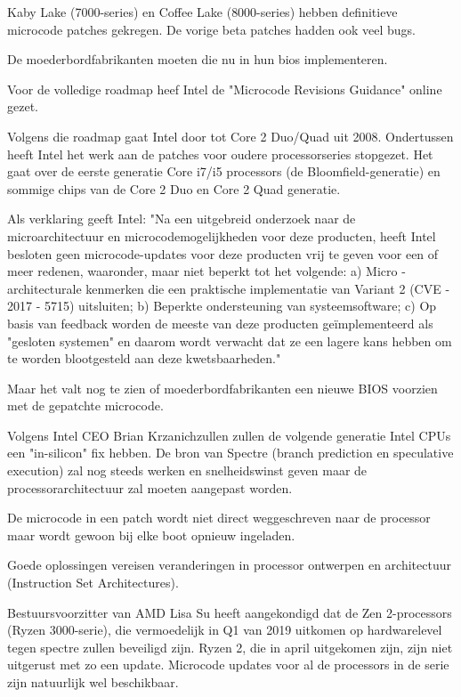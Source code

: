 Kaby Lake (7000-series) en Coffee Lake (8000-series) hebben definitieve microcode patches gekregen. De vorige beta patches hadden ook veel bugs.

De moederbordfabrikanten moeten die nu in hun bios implementeren.

Voor de volledige roadmap heef Intel de "Microcode Revisions Guidance" online gezet.

Volgens die roadmap gaat Intel door tot Core 2 Duo/Quad uit 2008.
Ondertussen heeft Intel het werk aan de patches voor oudere processorseries stopgezet.
Het gaat over de eerste generatie Core i7/i5 processors (de Bloomfield-generatie) en sommige chips van de Core 2 Duo en Core 2 Quad generatie.


Als verklaring geeft Intel: "Na een uitgebreid onderzoek naar de microarchitectuur en microcodemogelijkheden voor deze producten, heeft Intel besloten geen microcode-updates voor deze producten vrij te geven voor een of meer redenen, waaronder, maar niet beperkt tot het volgende:
a) Micro - architecturale kenmerken die een praktische implementatie van Variant 2 (CVE - 2017 - 5715) uitsluiten;
b) Beperkte ondersteuning van systeemsoftware;
c) Op basis van feedback worden de meeste van deze producten geïmplementeerd als "gesloten systemen" en daarom wordt verwacht dat ze een lagere kans hebben om te worden blootgesteld aan deze kwetsbaarheden." \parencite{Intel2018a}


Maar het valt nog te zien of moederbordfabrikanten een nieuwe BIOS voorzien met de gepatchte microcode.

Volgens Intel CEO Brian Krzanichzullen zullen de volgende generatie Intel CPUs een "in-silicon" fix hebben. De bron van Spectre (branch prediction en speculative execution) zal nog steeds werken en snelheidswinst geven maar de processorarchitectuur zal moeten aangepast worden.

De microcode in een patch wordt niet direct weggeschreven naar de processor maar wordt gewoon bij elke boot opnieuw ingeladen.

Goede oplossingen vereisen veranderingen in processor ontwerpen en architectuur (Instruction Set Architectures).

Bestuursvoorzitter van AMD Lisa Su heeft aangekondigd dat de Zen 2-processors (Ryzen 3000-serie), die vermoedelijk in Q1 van 2019 uitkomen op hardwarelevel tegen spectre zullen beveiligd zijn. Ryzen 2, die in april uitgekomen zijn, zijn niet uitgerust met zo een update. Microcode updates voor al de processors in de serie zijn natuurlijk wel beschikbaar.

